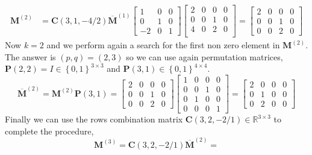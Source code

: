 \begin{example}
\begin{equation}
\begin{split}
					\bm{M}^{(2)} 	&= \bm{C}(3,1,-4/2)\overline{\bm{M}}^{(1)}  
					\begin{bmatrix}
						1 	& 	0 	& 0 \\
						0 	& 	1 	& 0 \\
						-2 	& 	0 	& 1
					\end{bmatrix} 
					\begin{bmatrix}
						2 & 0 & 0 & 0 \\
						0 & 0 & 1 & 0 \\
						4 & 0 & 2 & 0 \\
					\end{bmatrix}
					=
					\begin{bmatrix}
						2 & 0 & 0 & 0 \\
						0 & 0 & 1 & 0 \\
						0 & 0 & 2 & 0
					\end{bmatrix}
				\end{split}
			\end{equation}
			Now  $k=2$ and we perform again a search for the first non zero element in $\bm{M}^{(2)}$. The answer is $(p,q)=(2,3)$ so we can use again permutation matrices, $\bm{P}(2,2) = I\in\left\lbrace0,1 \right\rbrace^{3\times 3}$ and $\bm{P}(3,1)\in\left\lbrace0,1 \right\rbrace^{4\times 4}$.
			\begin{equation}
				\overline{\bm{M}}^{(2)} = \bm{M}^{(2)}\bm{P}(3,1) = 							\begin{bmatrix}
					2 & 0 & 0 & 0 \\
					0 & 0 & 1 & 0 \\
					0 & 0 & 2 & 0
				\end{bmatrix}
				\begin{bmatrix}
     				1 & 0 & 0 & 0 \\
     				0 & 0 & 1 & 0 \\
     				0 & 1 & 0 & 0 \\
     				0 & 0 & 0 & 1 
				\end{bmatrix}
				= 
				\begin{bmatrix}
					2 & 0 & 0 & 0 \\
					0 & 1 & 0 & 0 \\
					0 & 2 & 0 & 0 
				\end{bmatrix}
			\end{equation}
			Finally we can use the rows combination matrix $\bm{C}(3,2,-2/1)\in\mathbb{R}^{3\times 3}$ to complete the procedure,
			\begin{equation}
				\bm{M}^{(3)} = \bm{C}(3,2,-2/1)\overline{\bm{M}}^{(2)} = 

\end{equation}
\end{example}
